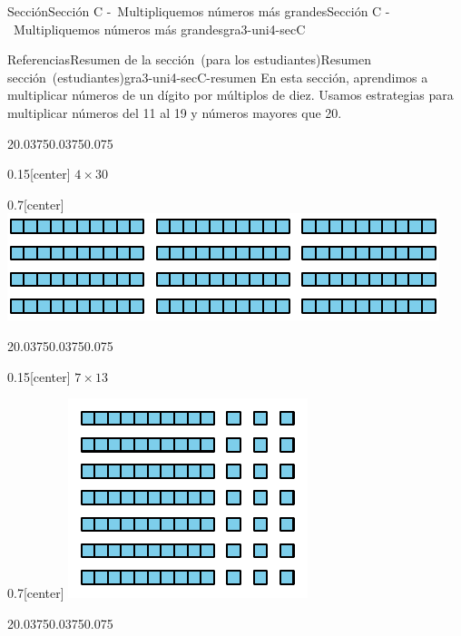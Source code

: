 \documentclass[oneside,10pt,]{article}
\begin{document}
\begin{sectionptx}{Sección}{Sección C -~Multipliquemos números más grandes}{}{Sección C -~Multipliquemos números más grandes}{}{}{gra3-uni4-secC}
\begin{references-subsection}{Referencias}{Resumen de la sección~(para los estudiantes)}{}{Resumen sección~(estudiantes)}{}{}{gra3-uni4-secC-resumen}
En esta sección, aprendimos a multiplicar números de un dígito por múltiplos de diez. Usamos estrategias para multiplicar números del 11 al 19 y números mayores que 20.%
\begin{sidebyside}{2}{0.0375}{0.0375}{0.075}%
\begin{sbspanel}{0.15}[center]%
\(4\times 30\)%
\end{sbspanel}%
\begin{sbspanel}{0.7}[center]%
\includegraphics[width=\linewidth]{external/svg-source/tikz-file-147742-scale13.pdf}
\end{sbspanel}%
\end{sidebyside}%
\begin{sidebyside}{2}{0.0375}{0.0375}{0.075}%
\begin{sbspanel}{0.15}[center]%
\(7\times 13\)%
\end{sbspanel}%
\begin{sbspanel}{0.7}[center]%
\includegraphics[width=\linewidth]{external/svg-source/tikz-file-141823-scale13.pdf}
\end{sbspanel}%
\end{sidebyside}%
\begin{sidebyside}{2}{0.0375}{0.0375}{0.075}%

\end{sidebyside}
\end{references-subsection}
\end{sectionptx}
\end{document}
